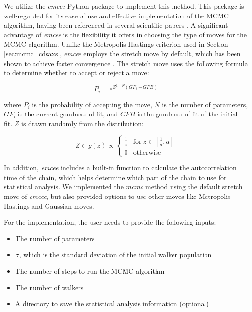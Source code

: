 \medskip

We utilize the \textit{emcee} Python package \cite{emcee} to implement this method. This package is well-regarded for its ease 
of use and effective implementation of the MCMC algorithm, having been referenced in several scientific papers \cite{emcee_refed}. 
A significant advantage of \textit{emcee} is the flexibility it offers in choosing the type of moves for the MCMC algorithm. Unlike 
the Metropolis-Hastings criterion used in Section \ref{sec:mcmc_cdsaxs}, \textit{emcee} employs the stretch move by default, which 
has been shown to achieve faster convergence \cite{emcee, goodman2010_strech_move}. The stretch move uses the following formula to 
determine whether to accept or reject a move:

\begin{equation}
    P_{i} = e^{Z^{1-N} (GF_{i} -GFB)}
\end{equation}

where \(P_{i}\) is the probability of accepting the move, \(N\) is the number of parameters, \(GF_{i}\) is the current goodness of fit, 
and \(GFB\) is the goodness of fit of the initial fit. \(Z\) is drawn randomly from the distribution:

\begin{equation}
    Z \in g(z) \propto 
    \begin{cases} 
      \frac{1}{z} & \text{for } z \in \left[\frac{1}{a}, a\right] \\
      0 & \text{otherwise}
    \end{cases}
\end{equation}

\medskip

In addition, \textit{emcee} includes a built-in function to calculate the autocorrelation time of the chain, which helps determine which part of the chain to use for statistical analysis. We implemented the \textit{mcmc} method using the default stretch move of \textit{emcee}, but also provided options to use other moves like Metropolis-Hastings and Gaussian moves.

\medskip

For the implementation, the user needs to provide the following inputs:
\begin{itemize}
    \item The number of parameters
    \item $\sigma$, which is the standard deviation of the initial walker population
    \item The number of steps to run the MCMC algorithm
    \item The number of walkers
    \item A directory to save the statistical analysis information (optional)
\end{itemize}


